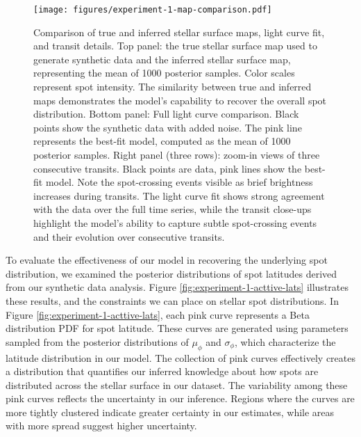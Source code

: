 \documentclass[twocolumn]{aastex631}
\begin{document}
\begin{figure*}[hbt!]
    \begin{centering}
        \texttt{[image: figures/experiment-1-map-comparison.pdf]}
        \caption{
            Comparison of true and inferred stellar surface maps, light curve fit, and transit details. Top panel: the true stellar surface map used to 
            generate synthetic data and the inferred stellar surface map, representing the mean of 1000 posterior samples. Color scales represent spot 
            intensity. The similarity between true and inferred maps demonstrates the model's capability to recover the overall spot distribution. Bottom panel:
            Full light curve comparison. Black points show the synthetic data with added noise. The pink line represents the best-fit model, 
            computed as the mean of 1000 posterior samples. Right panel (three rows): zoom-in views of three consecutive transits. Black points are data, 
            pink lines show the best-fit model. Note the spot-crossing events visible as brief brightness increases during transits. 
            The light curve fit shows strong agreement with the data over the full time series, while the transit close-ups highlight the model's ability 
            to capture subtle spot-crossing events and their evolution over consecutive transits.
        }
        \label{fig:experiment-1-map-comparison}
    \end{centering}
\end{figure*}
%
To evaluate the effectiveness of our model in recovering the underlying spot distribution, we examined the posterior distributions of spot latitudes 
derived from our synthetic data analysis. Figure \ref{fig:experiment-1-acttive-lats} illustrates these results, and the constraints we can place on 
stellar spot distributions. In Figure \ref{fig:experiment-1-acttive-lats}, each pink curve represents a Beta distribution PDF for spot latitude. 
These curves are generated using parameters sampled from the posterior distributions of $\mu_\phi$ and $\sigma_\phi$, which characterize the 
latitude distribution in our model. The collection of pink curves effectively creates a distribution that quantifies our inferred knowledge about 
how spots are distributed across the stellar surface in our dataset. The variability among these pink curves reflects the uncertainty in our inference. 
Regions where the curves are more tightly clustered indicate greater certainty in our estimates, while areas with more spread suggest higher uncertainty. 
\end{document}
